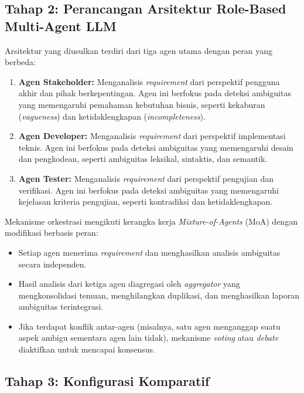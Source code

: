 \subsection{Tahap 2: Perancangan Arsitektur Role-Based Multi-Agent LLM}

Arsitektur yang diusulkan terdiri dari tiga agen utama dengan peran yang berbeda:

\begin{enumerate}
	\item \textbf{Agen Stakeholder:} Menganalisis \textit{requirement} dari perspektif pengguna akhir dan pihak berkepentingan. Agen ini berfokus pada deteksi ambiguitas yang memengaruhi pemahaman kebutuhan bisnis, seperti kekaburan (\textit{vagueness}) dan ketidaklengkapan (\textit{incompleteness}).
	\item \textbf{Agen Developer:} Menganalisis \textit{requirement} dari perspektif implementasi teknis. Agen ini berfokus pada deteksi ambiguitas yang memengaruhi desain dan pengkodean, seperti ambiguitas leksikal, sintaktis, dan semantik.
	\item \textbf{Agen Tester:} Menganalisis \textit{requirement} dari perspektif pengujian dan verifikasi. Agen ini berfokus pada deteksi ambiguitas yang memengaruhi kejelasan kriteria pengujian, seperti kontradiksi dan ketidaklengkapan.
\end{enumerate}

Mekanisme orkestrasi mengikuti kerangka kerja \textit{Mixture-of-Agents} (MoA) \cite{wang2024moa} dengan modifikasi berbasis peran:
\begin{itemize}
	\item Setiap agen menerima \textit{requirement} dan menghasilkan analisis ambiguitas secara independen.
	\item Hasil analisis dari ketiga agen diagregasi oleh \textit{aggregator} yang mengkonsolidasi temuan, menghilangkan duplikasi, dan menghasilkan laporan ambiguitas terintegrasi.
	\item Jika terdapat konflik antar-agen (misalnya, satu agen menganggap suatu aspek ambigu sementara agen lain tidak), mekanisme \textit{voting} atau \textit{debate} diaktifkan untuk mencapai konsensus.
\end{itemize}

\subsection{Tahap 3: Konfigurasi Komparatif}

